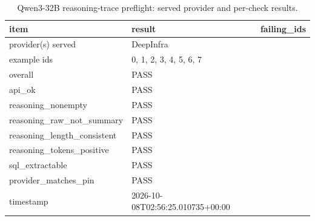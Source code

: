 \begin{table}[htbp]
\caption{Qwen3-32B reasoning-trace preflight: served provider and per-check results.}
\label{tab:task1_preflight}
\begin{tabular}{lll}
\toprule
item & result & failing\_ids \\
\midrule
provider(s) served & DeepInfra &  \\
example ids & 0, 1, 2, 3, 4, 5, 6, 7 &  \\
overall & PASS &  \\
api_ok & PASS &  \\
reasoning_nonempty & PASS &  \\
reasoning_raw_not_summary & PASS &  \\
reasoning_length_consistent & PASS &  \\
reasoning_tokens_positive & PASS &  \\
sql_extractable & PASS &  \\
provider_matches_pin & PASS &  \\
timestamp & 2026-10-08T02:56:25.010735+00:00 &  \\
\bottomrule
\end{tabular}
\end{table}
